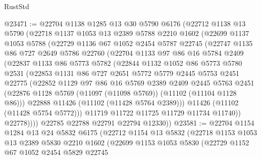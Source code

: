 \begin{lexlean}{RustStd}
\begin{coremodule}
@23471 := @22704
    @1138
    @1285
    @13
    @30
    @5790
    @6176
    (@22712
      @1138
      @13
      @5790
      (@22718
        @1137
        @1053
        @13
        @2389
        @5788
        @2210
        @1602
        (@22699
          @1137
          @1053
          @5788
          (@22729
            @1136
            @67
            @1052
            @2454
            @5787
            @22745
            (@22747
              @1135
              @86
              @727
              @2649
              @5786
              @22760
              (@22704
                @1133
                @97
                @86
                @16
                @5784
                @2409
                (@22837
                  @1133
                  @86
                  @5773
                  @5782
                  (@22844
                    @1132
                    @1052
                    @86
                    @5773
                    @5780
                    @2531
                    (@22853
                      @1131
                      @86
                      @727
                      @2651
                      @5772
                      @5779
                      @2445
                      @5753
                      @2451
                      @22775
                      (@22852
                        @1129
                        @97
                        @86
                        @16
                        @5769
                        @2389
                        @2409
                        @2445
                        @5763
                        @2451
                        (@22876 @1128 @5769 (@11097 (@11098 @5769)) (@11102 (@11104 @1128 @86)))
                        @22888
                        @11426
                        (@11102 (@11428 @5764 @2389)))
                      @11426
                      (@11102 (@11428 @5754 @5772)))
                    @11719
                    @11722
                    @11725
                    @11729
                    @11734
                    @11740))
                @22778))))
        @22785
        @22788
        @22791
        @22794
        @12330))
@23581 := @22704
    @1154
    @1284
    @13
    @24
    @5832
    @6175
    (@22712
      @1154
      @13
      @5832
      (@22718
        @1153
        @1053
        @13
        @2389
        @5830
        @2210
        @1602
        (@22699
          @1153
          @1053
          @5830
          (@22729
            @1152
            @67
            @1052
            @2454
            @5829
            @22745

\end{coremodule}
\end{lexlean}
